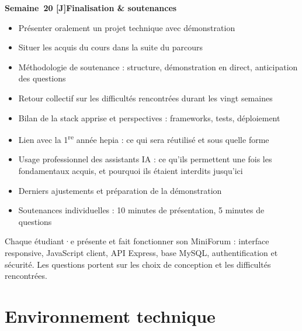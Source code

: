 \documentclass[a4paper,11pt]{article}
\newcommand{\semainetitre}[4]{%
  \needspace{9\baselineskip}%
  \vspace{8pt}
  \noindent
  \begin{tcolorbox}[
    enhanced, colback=cfptBlack, colframe=cfptBlack,
    boxrule=0pt, arc=3pt, boxsep=0pt,
    left=8pt, right=90pt, top=4pt, bottom=4pt,
    overlay={%
      \node[anchor=east, fill=cfptYellow, text=cfptBlack,
            rounded corners=2pt, inner xsep=6pt, inner ysep=3pt,
            font=\scriptsize\bfseries]
        at ([xshift=-6pt]frame.east) {#3};}
  ]
  \color{white}\bfseries\small Semaine~#1 \quad\textcolor{cfptYellow}{[#4]}\quad #2
  \end{tcolorbox}
  \vspace{-4pt}
}
\newcommand{\contenutitre}[1]{%
  \vspace{4pt}
  \noindent{\small\color{accentBlue}\textbf{#1}}\vspace{2pt}
}
\begin{document}
\semainetitre{20}{Finalisation \& soutenances}{3h cours / 4h TP}{J}
\begin{tcolorbox}[semaine]
\begin{tcolorbox}[objectifs]
\begin{itemize}
  \item Présenter oralement un projet technique avec démonstration
  \item Situer les acquis du cours dans la suite du parcours
\end{itemize}
\end{tcolorbox}
\vspace{4pt}
\contenutitre{Cours}
\begin{itemize}
  \item Méthodologie de soutenance : structure, démonstration en direct, anticipation des questions
  \item Retour collectif sur les difficultés rencontrées durant les vingt semaines
  \item Bilan de la stack apprise et perspectives : frameworks, tests, déploiement
  \item Lien avec la 1\textsuperscript{re} année hepia : ce qui sera réutilisé et sous quelle forme
  \item Usage professionnel des assistants IA : ce qu'ils permettent une fois les fondamentaux acquis, et pourquoi ils étaient interdits jusqu'ici
\end{itemize}
\contenutitre{Travaux pratiques}
\begin{itemize}
  \item Derniers ajustements et préparation de la démonstration
  \item Soutenances individuelles : 10 minutes de présentation, 5 minutes de questions
\end{itemize}
\end{tcolorbox}
\begin{tcolorbox}[filrouge={Soutenance du MiniForum complet}]
\small Chaque étudiant·e présente et fait fonctionner son MiniForum : interface responsive, JavaScript client, API Express, base MySQL, authentification et sécurité. Les questions portent sur les choix de conception et les difficultés rencontrées.
\end{tcolorbox}

\newpage

\section{Environnement technique}
\end{document}
